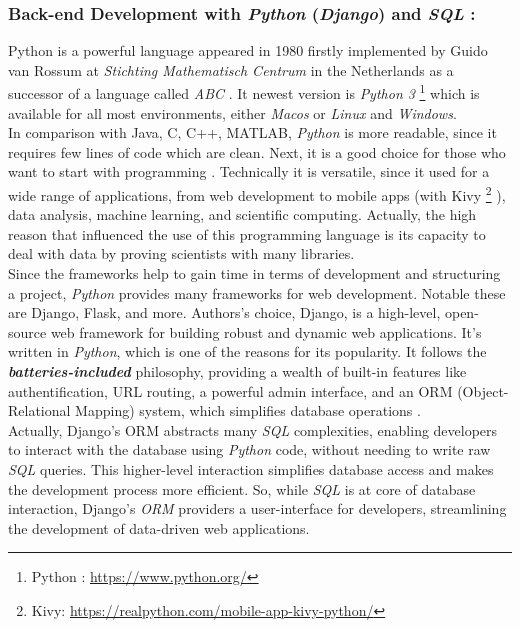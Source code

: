 \documentclass[12pt,a4paper, oneside]{book}
\begin{document}
	\subsubsection{Back-end Development with \textit{Python} (\textit{Django}) and \textit{SQL} :}  
	Python is a powerful language appeared in 1980 firstly implemented by Guido van Rossum at \textit{Stichting Mathematisch Centrum} in the Netherlands as a successor of a language called  \textit{ABC} \citep{tulchak2016history}. It newest version is \textit{Python 3} \footnote{Python : \url{https://www.python.org/}}  which is available for all most environments, either \textit{Macos} or \textit{Linux} and \textit{Windows}.\\
	 	 
	 In comparison with {Java, C, C++, MATLAB}, \textit{Python} is more readable, since it requires few lines of code which are clean. Next, it is a good choice for those who want to start with programming \citep{bogdanchikov2013python}. Technically it is versatile, since it used for a wide range of applications, from web development to mobile apps (with Kivy \footnote{Kivy: \url{https://realpython.com/mobile-app-kivy-python/}} ), data analysis, machine learning, and scientific computing. Actually, the high reason that influenced the use of this programming language is its capacity to deal with data by proving scientists with many libraries. \\
	 
	 Since the frameworks help to gain time in terms of development and structuring a project, \textit{Python} provides many frameworks for web development. Notable these are Django, Flask, and more. Authors's choice, Django, is a high-level, open-source web framework for building robust and dynamic web applications. It's written in \textit{Python}, which is one of the reasons for its popularity. It follows the \textbf{\textit{batteries-included}} philosophy, providing a wealth of built-in features like authentification, URL routing, a powerful admin interface, and an ORM (Object-Relational Mapping) system, which simplifies database operations \citep{alchin2013pro}. \\
	 
	Actually, Django's ORM abstracts many \textit{SQL} complexities, enabling developers to interact with the database using \textit{Python} code, without needing to write raw \textit{SQL} queries. This higher-level interaction simplifies database access and makes the development process more efficient. So, while \textit{SQL} is at core of database interaction, Django's \textit{ORM} providers a user-interface for developers, streamlining the development of data-driven web applications.\\ 
	
\end{document}
